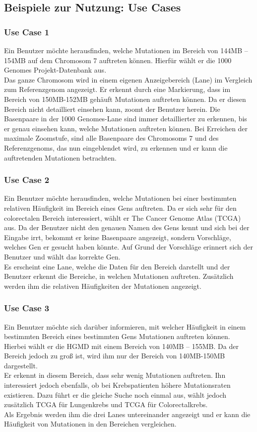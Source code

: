 \newpage
\subsection{Beispiele zur Nutzung: Use Cases}
\subsubsection{Use Case 1}
Ein Benutzer möchte herausfinden, welche Mutationen im Bereich von 144MB – 154MB auf dem Chromosom 7 auftreten können. Hierfür wählt er die 1000 Genomes Projekt-Datenbank aus. \\
Das ganze Chromosom wird in einem eigenen Anzeigebereich (Lane) im Vergleich zum Referenzgenom angezeigt. Er erkennt durch eine Markierung, dass im Bereich von 150MB-152MB gehäuft Mutationen auftreten können. Da er diesen Bereich nicht detailliert einsehen kann, zoomt der Benutzer herein. Die Basenpaare in der 1000 Genomes-Lane sind immer detaillierter zu erkennen, bis er genau einsehen kann, welche Mutationen auftreten können. Bei Erreichen der maximale Zoomstufe, sind alle Basenpaare des Chromosoms 7 und des Referenzgenoms, das nun eingeblendet wird, zu erkennen und er kann die auftretenden Mutationen betrachten.
\subsubsection{Use Case 2}
Ein Benutzer möchte herausfinden, welche Mutationen bei einer bestimmten relativen Häufigkeit im Bereich eines Gens auftreten. Da er sich sehr für den colorectalen Bereich interessiert, wählt er The Cancer Genome Atlas (TCGA) aus. Da der Benutzer nicht den genauen Namen des Gens kennt und sich bei der Eingabe irrt, bekommt er keine Basenpaare angezeigt, sondern Vorschläge, welches Gen er gesucht haben könnte. Auf Grund der Vorschläge erinnert sich der Benutzer und wählt das korrekte Gen. \\
Es erscheint eine Lane, welche die Daten für den Bereich darstellt und der Benutzer erkennt die Bereiche, in welchen Mutationen auftreten. Zusätzlich werden ihm die relativen Häufigkeiten der Mutationen angezeigt.
\subsubsection{Use Case 3}
Ein Benutzer möchte sich darüber informieren, mit welcher Häufigkeit in einem bestimmten Bereich eines bestimmten Gens Mutationen auftreten können. Hierbei wählt er die HGMD mit einem Bereich von 140MB – 155MB. Da der Bereich jedoch zu groß ist,
wird ihm nur der Bereich von 140MB-150MB dargestellt. \\
Er erkennt in diesem Bereich, dass sehr wenig Mutationen auftreten. Ihn interessiert jedoch ebenfalls, ob bei Krebspatienten höhere Mutationsraten existieren. Dazu führt er die gleiche Suche noch einmal aus, wählt jedoch zusätzlich TCGA für Lungenkrebs und TCGA für Colorectalkrebs. \\
Als Ergebnis werden ihm die drei Lanes untereinander angezeigt und er kann die Häufigkeit von Mutationen in den Bereichen vergleichen.

